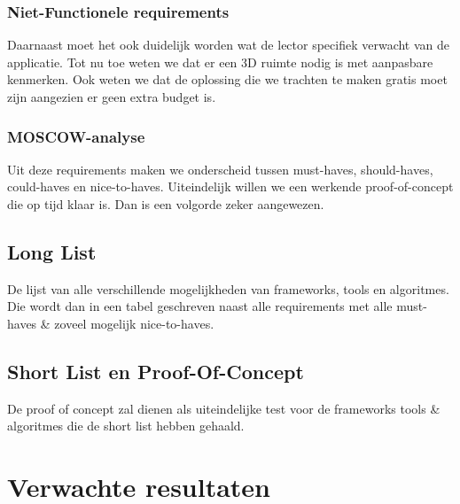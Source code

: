 \documentclass{hogent-article}
\begin{document}
\subsubsection{Niet-Functionele requirements}

Daarnaast moet het ook duidelijk worden wat de lector specifiek verwacht van de applicatie. Tot nu toe weten we dat er een 3D ruimte nodig is met aanpasbare kenmerken. Ook weten we dat de oplossing die we trachten te maken gratis moet zijn aangezien er geen extra budget is. 

\subsubsection{MOSCOW-analyse}

Uit deze requirements maken we onderscheid tussen must-haves, should-haves, could-haves en nice-to-haves. Uiteindelijk willen we een werkende proof-of-concept die op tijd klaar is. Dan is een volgorde zeker aangewezen.

\subsection{Long List}

De lijst van alle verschillende mogelijkheden van frameworks, tools en algoritmes. Die wordt dan in een tabel geschreven naast alle requirements met alle must-haves & zoveel mogelijk nice-to-haves.

\subsection{Short List en Proof-Of-Concept}

De proof of concept zal dienen als uiteindelijke test voor de frameworks tools & algoritmes die de short list hebben gehaald. 

\section{Verwachte resultaten}%
\label{sec:verwachte-resultaten}

\end{document}
